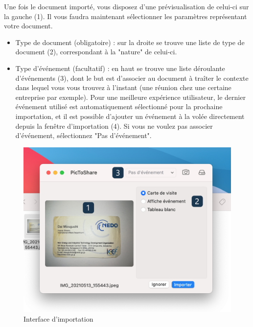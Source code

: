 \documentclass[a4paper,11pt]{article}
\begin{document}
	Une fois le document importé, vous disposez d'une prévisualisation de celui-ci sur la gauche (1). Il vous faudra maintenant sélectionner les paramètres représentant votre document.

	\begin{itemize}

		\item Type de document (obligatoire) : sur la droite se trouve une liste de type de document (2), correspondant à la "nature" de celui-ci.
		\item Type d'événement (facultatif) : en haut se trouve une liste déroulante d'événements (3), dont le but est d'associer au document à traîter le contexte dans lequel vous vous trouvez à l'instant (une réunion chez une certaine entreprise par exemple). Pour une meilleure expérience utilisateur, le dernier événement utilisé est automatiquement sélectionné pour la prochaine importation, et il est possible d'ajouter un événement à la volée directement depuis la fenêtre d'importation (4). Si vous ne voulez pas associer d'événement, sélectionnez "Pas d'événement".

	\end{itemize}

	\begin{figure}[h]
		\centering
		\includegraphics[width=12cm]{Importation_standby}
		\caption{Interface d'importation}
	\end{figure}
\end{document}
